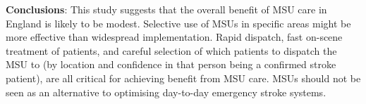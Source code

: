 \textbf{Conclusions}: This study suggests that the overall benefit of MSU care in England is likely to be modest. Selective use of MSUs in specific areas might be more effective than widespread implementation. Rapid dispatch, fast on-scene treatment of patients, and careful selection of which patients to dispatch the MSU to (by location and confidence in that person being a confirmed stroke patient), are all critical for achieving benefit from MSU care. MSUs should not be seen as an alternative to optimising day-to-day emergency stroke systems.
